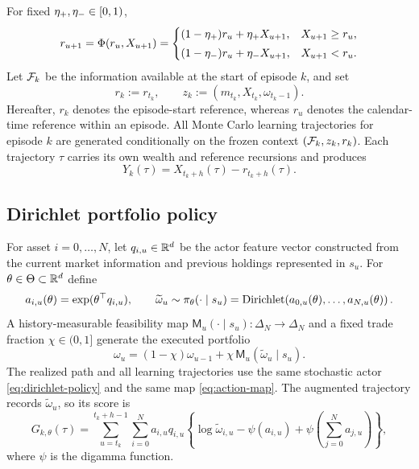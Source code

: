 For fixed $\eta_{+},\eta_{-}\in[0,1)$,
\begin{equation}\label{eq:reference-update}
 r_{u+1}=\Phi(r_u,X_{u+1})
 =\begin{cases}
 (1-\eta_{+})r_u+\eta_{+} X_{u+1}, & X_{u+1}\ge r_u,\\[1mm]
 (1-\eta_{-})r_u+\eta_{-} X_{u+1}, & X_{u+1}<r_u.
 \end{cases}
\end{equation}
Let $\mathcal F_k$ be the information available at the start of episode $k$, and set
\begin{equation}\label{eq:start-context}
 r_k:=r_{t_k},
 \qquad
 z_k:=(m_{t_k},X_{t_k},\omega_{t_k-1}).
\end{equation}
Hereafter, $r_k$ denotes the episode-start reference, whereas $r_u$ denotes the calendar-time reference within an episode.  All Monte Carlo learning trajectories for episode $k$ are generated conditionally on the frozen context $(\mathcal F_k,z_k,r_k)$.  Each trajectory $\tau$ carries its own wealth and reference recursions and produces
\begin{equation}\label{eq:relative-outcome}
 Y_k(\tau)=X_{t_k+h}(\tau)-r_{t_k+h}(\tau).
\end{equation}

\subsection{Dirichlet portfolio policy}

For asset $i=0,\ldots,N$, let $q_{i,u}\in\mathbb R^d$ be the actor feature vector constructed from the current market information and previous holdings represented in $s_u$.  For $\theta\in\Theta\subset\mathbb R^d$ define
\begin{equation}\label{eq:dirichlet-policy}
 a_{i,u}(\theta)=\exp(\theta^\top q_{i,u}),
 \qquad
 \widetilde\omega_u\sim
 \pi_\theta(\cdot\mid s_u)
 =\operatorname{Dirichlet}\!\left(a_{0,u}(\theta),\ldots,a_{N,u}(\theta)\right).
\end{equation}
A history-measurable feasibility map $\mathsf M_u(\cdot\mid s_u):\Delta_N\to\Delta_N$ and a fixed trade fraction $\chi\in(0,1]$ generate the executed portfolio
\begin{equation}\label{eq:action-map}
 \omega_u=(1-\chi)\omega_{u-1}+\chi\,\mathsf M_u(\widetilde\omega_u\mid s_u).
\end{equation}
The realized path and all learning trajectories use the same stochastic actor \eqref{eq:dirichlet-policy} and the same map \eqref{eq:action-map}.  The augmented trajectory records $\widetilde\omega_u$, so its score is
\begin{equation}\label{eq:trajectory-score}
 G_{k,\theta}(\tau)
 =\sum_{u=t_k}^{t_k+h-1}\sum_{i=0}^{N}
 a_{i,u}q_{i,u}
 \left\{\log\widetilde\omega_{i,u}
 -\psi(a_{i,u})+\psi\!\left(\sum_{j=0}^{N}a_{j,u}\right)\right\},
\end{equation}
where $\psi$ is the digamma function.

